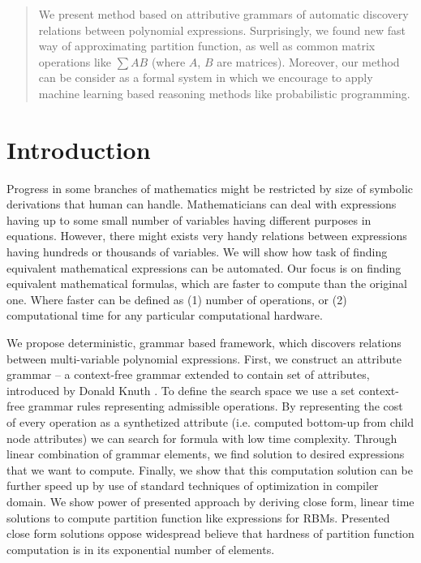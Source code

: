 \documentclass{article}
\begin{document}
 





\vskip 0.3in


\begin{abstract} 
We present method based on attributive grammars of automatic discovery relations between polynomial expressions.
Surprisingly, we found new fast way of approximating partition function, as well as common matrix operations
like $\sum AB$ (where $A$, $B$ are matrices). Moreover, our method can be consider as a formal system in which
we encourage to apply machine learning based reasoning methods like probabilistic programming.

\end{abstract} 


\section{Introduction} \label{introduction} 
Progress in some branches of
mathematics might be restricted by size of symbolic derivations that human can
handle.  Mathematicians can deal with expressions having up to some small
number of variables having different purposes in equations. However, there
might exists very handy relations between expressions having hundreds or
thousands of variables. We will show how task of finding equivalent
mathematical expressions can be automated. Our focus is on finding equivalent
mathematical formulas, which are faster to compute than the original one. Where
faster can be defined as (1) number of operations, or (2) computational time
for any particular computational hardware.


We propose deterministic, grammar based framework, which discovers relations between
multi-variable polynomial expressions. First, we construct an attribute grammar
-- a context-free grammar extended to contain set of attributes, introduced by
Donald Knuth \cite{knuth1968semantics}. To define the search space we use a set
context-free grammar rules representing admissible operations. By representing
the cost of every operation as a synthetized attribute (i.e. computed bottom-up from child node attributes)
we can search for formula with low time complexity.
Through linear combination of grammar elements, we find solution to desired 
expressions that we want to compute. Finally, we
show that this computation solution can be further speed up by use of standard
techniques of optimization in compiler domain. We show power of presented
approach by deriving close form, linear time solutions to compute partition
function like expressions for RBMs. Presented close form solutions oppose
widespread believe that hardness of partition function computation is in its
exponential number of elements.
\end{document}
